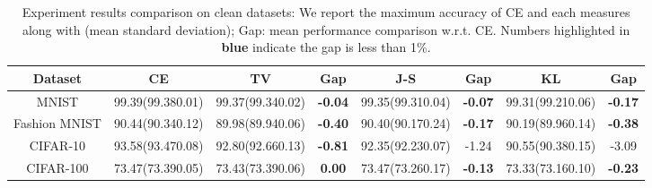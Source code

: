 \begin{table*}[!ht]
\scriptsize
\centering
\begin{threeparttable}
\begin{tabular}{c|c|c|c|c|c|c|c}
\hline
Dataset &  CE &  \textbf{TV} & Gap & \textbf{J-S} & Gap & \textbf{KL} & Gap \\ \hline\hline
\multirow{1}{*}{MNIST}
& 99.39(99.380.01) & 99.37(99.340.02) &{\color{blue}\textbf{-0.04}}  & 99.35(99.310.04) & {\color{blue}\textbf{-0.07}} & 99.31(99.210.06) & {\color{blue}\textbf{-0.17}}
\\ 
\hline
\multirow{1}{*}{Fashion MNIST}
& 90.44(90.340.12) & 89.98(89.940.06) & {\color{blue}\textbf{-0.40 }}& 90.40(90.170.24)  & {\color{blue}\textbf{-0.17}} & 90.19(89.960.14) & {\color{blue}\textbf{-0.38}}
\\ 
\hline
\multirow{1}{*}{CIFAR-10}
& 93.58(93.470.08) & 92.80(92.660.13) &{\color{blue}\textbf{-0.81}} & 92.35(92.230.07) & -1.24 & 90.55(90.380.15) & -3.09
\\ 
\hline
\multirow{1}{*}{CIFAR-100}
& 73.47(73.390.05) & 73.43(73.390.06) & {\color{blue}\textbf{0.00}} & 73.47(73.260.17)& {\color{blue}\textbf{-0.13}} & 73.33(73.160.10) & {\color{blue}\textbf{-0.23}}
\\ 
\hline
\end{tabular}
\end{threeparttable}
\caption{Experiment results comparison on clean datasets: We report the maximum accuracy of CE and each  measures along with (mean  standard deviation); Gap: mean performance comparison w.r.t. CE. Numbers highlighted in \color{blue}\textbf{{blue}} \color{black} indicate the gap is less than 1\%.
}
\label{Tab:hg}
\end{table*}

